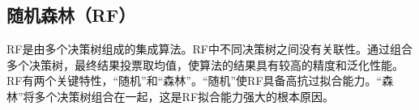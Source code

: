 



\subsection{随机森林（RF）}\label{sec:ml_rf}

RF是由多个决策树组成的集成算法。RF中不同决策树之间没有关联性。通过组合多个决策树，最终结果投票取均值，使算法的结果具有较高的精度和泛化性能。RF有两个关键特性，“随机”和“森林”。“随机”使RF具备高抗过拟合能力。“森林”将多个决策树组合在一起，这是RF拟合能力强大的根本原因。

